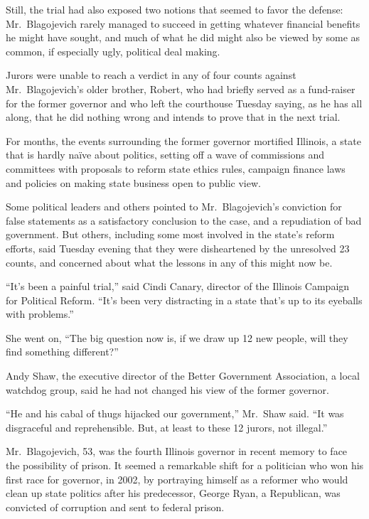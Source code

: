 ﻿\documentclass[12pt]{article}
\begin{document}
Still, the trial had also exposed two notions that seemed to favor the defense: Mr.~Blagojevich
rarely managed to succeed in getting whatever financial benefits he might have sought, and much of
what he did might also be viewed by some as common, if especially ugly, political deal making.

Jurors were unable to reach a verdict in any of four counts against Mr.~Blagojevich's older brother,
Robert, who had briefly served as a fund-raiser for the former governor and who left the courthouse
Tuesday saying, as he has all along, that he did nothing wrong and intends to prove that in the next
trial.

For months, the events surrounding the former governor mortified Illinois, a state that is hardly
na\"ive about politics, setting off a wave of commissions and committees with proposals to reform
state ethics rules, campaign finance laws and policies on making state business open to public view.

Some political leaders and others pointed to Mr.~Blagojevich's conviction for false statements as a
satisfactory conclusion to the case, and a repudiation of bad government. But others, including some
most involved in the state's reform efforts, said Tuesday evening that they were disheartened by the
unresolved 23 counts, and concerned about what the lessons in any of this might now be.

``It's been a painful trial,'' said Cindi Canary, director of the Illinois Campaign for Political
Reform. ``It's been very distracting in a state that's up to its eyeballs with problems.''

She went on, ``The big question now is, if we draw up 12 new people, will they find something
different?''

Andy Shaw, the executive director of the Better Government Association, a local watchdog group, said
he had not changed his view of the former governor.

``He and his cabal of thugs hijacked our government,'' Mr.~Shaw said. ``It was disgraceful and
reprehensible. But, at least to these 12 jurors, not illegal.''

Mr.~Blagojevich, 53, was the fourth Illinois governor in recent memory to face the possibility of
prison. It seemed a remarkable shift for a politician who won his first race for governor, in 2002,
by portraying himself as a reformer who would clean up state politics after his predecessor, George
Ryan, a Republican, was convicted of corruption and sent to federal prison.
\end{document}
